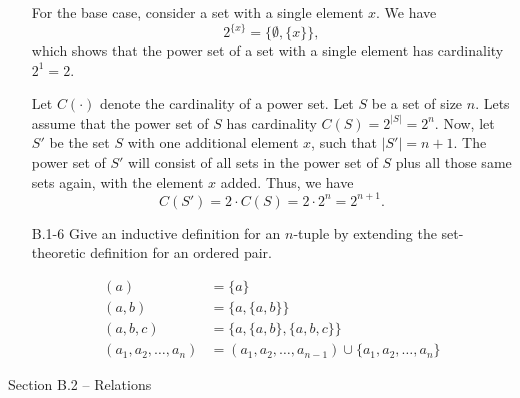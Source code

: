 \begin{enumerate}
\begin{framed}
For the base case, consider a set with a single element $x$. We have
\[
  2^{\{x\}} = \{\emptyset, \{x\}\},
\]
which shows that the power set of a set with a single element has cardinality
$2^1 = 2$.

Let $C(\cdot)$ denote the cardinality of a power set. Let $S$ be a set of size
$n$. Lets assume that the power set of $S$ has cardinality
$C(S) = 2^{|S|} = 2^n$. Now, let $S'$ be the set $S$ with one additional element
$x$, such that $|S'| = n + 1$. The power set of $S'$ will consist of all sets
in the power set of $S$ plus all those same sets again, with the element $x$
added. Thus, we have
\[
  C(S') = 2 \cdot C(S) = 2 \cdot 2^n = 2^{n + 1}.
\]
\end{framed}

\item[B.1{-}6]{Give an inductive definition for an $n$-tuple by extending the
set-theoretic definition for an ordered pair.}

\begin{framed}
\begin{equation*}
\begin{aligned}
  (a) &= \{a\}\\
  (a, b) &= \{a, \{a, b\}\}\\
  (a, b, c) &= \{a, \{a, b\}, \{a, b, c\}\}\\
  (a_1, a_2, \dots, a_n) &= (a_1, a_2, \dots, a_{n - 1}) \cup \{a_1, a_2, \dots, a_n\}
\end{aligned}
\end{equation*}
\end{framed}

\end{enumerate}

\newpage

{\large Section B.2 {--} Relations}

